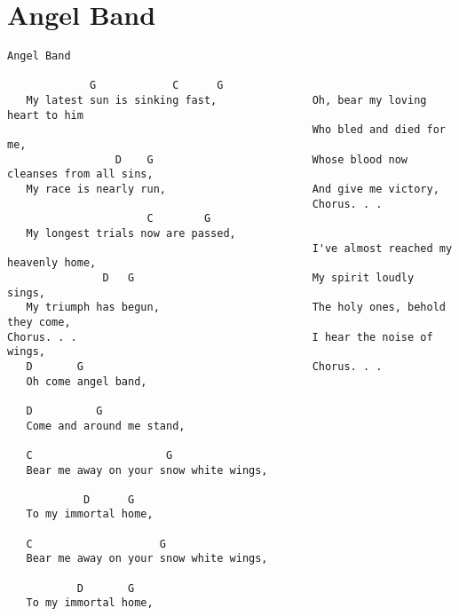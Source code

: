 \documentclass[leqno]{memoir}
\begin{document}
\chapter{Angel Band}
\begin{verbatim}
Angel Band

             G            C      G
   My latest sun is sinking fast,               Oh, bear my loving heart to him
                                                Who bled and died for me,
                 D    G                         Whose blood now cleanses from all sins,
   My race is nearly run,                       And give me victory,
                                                Chorus. . .
                      C        G
   My longest trials now are passed,
                                                I've almost reached my heavenly home,
               D   G                            My spirit loudly sings,
   My triumph has begun,                        The holy ones, behold they come,
Chorus. . .                                     I hear the noise of wings,
   D       G                                    Chorus. . .
   Oh come angel band,

   D          G
   Come and around me stand,

   C                     G
   Bear me away on your snow white wings,

            D      G
   To my immortal home,

   C                    G
   Bear me away on your snow white wings,

           D       G
   To my immortal home,
\end{verbatim}
\newpage
\end{document}
